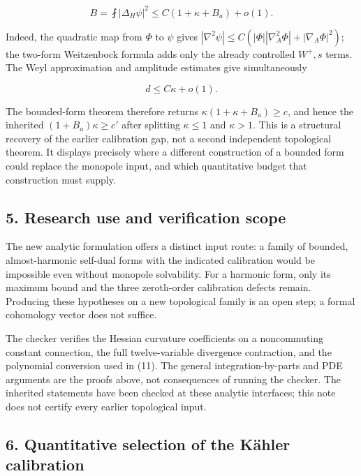 \documentclass[
  10pt,
]{article}
\begin{document}
\[
 B=\fint|\Delta_H\psi|^2\le C(1+\kappa+B_a)+o(1).
\]

Indeed, the quadratic map from \(\Phi\) to \(\psi\) gives
\(|\nabla^2\psi|\le C(|\Phi||\nabla_A^2\Phi|+|\nabla_A\Phi|^2)\); the
two-form Weitzenbock formula adds only the already controlled \(W^+,s\)
terms. The Weyl approximation and amplitude estimates give
simultaneously

\[
                         d\le C\kappa+o(1).
\]

The bounded-form theorem therefore returns
\(\kappa(1+\kappa+B_a)\ge c\), and hence the inherited
\((1+B_a)\kappa\ge c'\) after splitting \(\kappa\le1\) and \(\kappa>1\).
This is a structural recovery of the earlier calibration gap, not a
second independent topological theorem. It displays precisely where a
different construction of a bounded form could replace the monopole
input, and which quantitative budget that construction must supply.

\hypertarget{research-use-and-verification-scope}{%
\subsection{5. Research use and verification
scope}\label{research-use-and-verification-scope}}

The new analytic formulation offers a distinct input route: a family of
bounded, almost-harmonic self-dual forms with the indicated calibration
would be impossible even without monopole solvability. For a harmonic
form, only its maximum bound and the three zeroth-order calibration
defects remain. Producing these hypotheses on a new topological family
is an open step; a formal cohomology vector does not suffice.

The checker verifies the Hessian curvature coefficients on a
noncommuting constant connection, the full twelve-variable divergence
contraction, and the polynomial conversion used in (11). The general
integration-by-parts and PDE arguments are the proofs above, not
consequences of running the checker. The inherited statements have been
checked at these analytic interfaces; this note does not certify every
earlier topological input.

\hypertarget{quantitative-selection-of-the-kuxe4hler-calibration}{%
\subsection{6. Quantitative selection of the Kähler
calibration}\label{quantitative-selection-of-the-kuxe4hler-calibration}}
\end{document}
